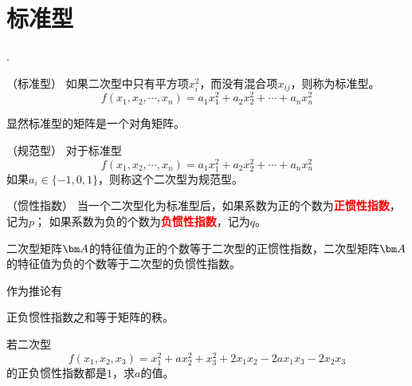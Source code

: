 \section{标准型}
.
\begin{definition}
    （标准型）
    如果二次型中只有平方项$x_i^2$，而没有混合项$x_{ij}$，则称为标准型。
    \[ f(x_1,x_2,\cdots,x_n) = a_1x_1^2 + a_2x_2^2 + \cdots + a_nx_n^2 \]
\end{definition}
显然标准型的矩阵是一个对角矩阵。

\begin{definition}
    （规范型）
    对于标准型
    \[ f(x_1,x_2,\cdots,x_n) = a_1x_1^2 + a_2x_2^2 + \cdots + a_nx_n^2 \]
    如果$a_i \in \{-1,0,1\}$，则称这个二次型为规范型。
\end{definition}

\begin{definition}
    （惯性指数）
    当一个二次型化为标准型后，如果系数为正的个数为\textcolor{red}{\textbf{\textsf{正惯性指数}}}，记为$p$；
    如果系数为负的个数为\textcolor{red}{\textbf{\textsf{负惯性指数}}}，记为$q$。
\end{definition}
\begin{theorem}
    二次型矩阵$\mat{A}$的特征值为正的个数等于二次型的正惯性指数，二次型矩阵$\mat{A}$的特征值为负的个数等于二次型的负惯性指数。
\end{theorem}
作为推论有
\begin{theorem}
    正负惯性指数之和等于矩阵的秩。
\end{theorem}
\begin{example}
    若二次型
    \[ f(x_1,x_2,x_3) = x_1^2 + ax_2^2 + x_3^2 + 2x_1x_2 - 2ax_1x_3 - 2x_2x_3 \]
    的正负惯性指数都是$1$，求$a$的值。
\end{example}
